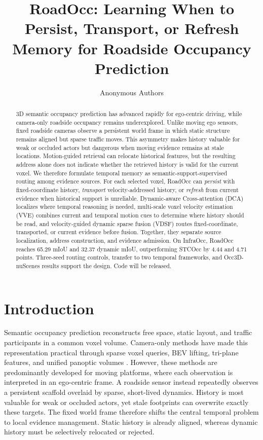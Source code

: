 \documentclass{article}
\title{RoadOcc: Learning When to Persist, Transport, or Refresh Memory for Roadside Occupancy Prediction}
\author{Anonymous Authors}
\newcommand{\method}{RoadOcc}
\begin{document}
\maketitle

\begin{abstract}
3D semantic occupancy prediction has advanced rapidly for ego-centric driving,
while camera-only roadside occupancy remains underexplored. Unlike moving ego
sensors, fixed roadside cameras observe a persistent world frame in which static
structure remains aligned but sparse traffic moves. This asymmetry makes history
valuable for weak or occluded actors but dangerous when moving evidence remains
at stale locations. Motion-guided retrieval can relocate historical features,
but the resulting address alone does not indicate whether the retrieved history
is valid for the current voxel. We therefore formulate temporal memory
as semantic-support-supervised routing among evidence sources. For each selected voxel,
\method{} can \emph{persist} with fixed-coordinate history, \emph{transport}
velocity-addressed history, or \emph{refresh} from current evidence when
historical support is unreliable. Dynamic-aware Cross-attention (DCA) localizes
where temporal reasoning is needed, multi-scale voxel velocity estimation (VVE)
combines current and temporal motion cues to determine where history should be
read, and velocity-guided dynamic sparse fusion (VDSF) routes fixed-coordinate,
transported, or current evidence before fusion. Together, they separate source
localization, address construction, and evidence admission. On InfraOcc,
RoadOcc reaches 65.29 mIoU and 32.37 dynamic mIoU, outperforming STCOcc by
4.44 and 4.71 points. Three-seed routing controls, transfer to two temporal
frameworks, and Occ3D-nuScenes results support the design. Code will be released.
\end{abstract}

\section{Introduction}
\label{sec:introduction}

Semantic occupancy prediction reconstructs free space, static layout, and
traffic participants in a common voxel volume. Camera-only methods have made
this representation practical through sparse voxel queries, BEV lifting,
tri-plane features, and unified panoptic volumes
\citep{MonoScene,VoxFormer,OpenOccupancy,Occ3D2023,BEVFormer,TPVFormer,
SurroundOcc,SparseOcc,GaussianFormer}. However, these methods
are predominantly developed for moving platforms, where each observation is
interpreted in an ego-centric frame. A roadside sensor instead repeatedly
observes a persistent scaffold overlaid by sparse, short-lived dynamics. History
is most valuable for weak or occluded actors, yet stale footprints can overwrite
exactly these targets. The fixed world frame therefore shifts the central
temporal problem to local evidence management.
Static history is already aligned, whereas dynamic history must be selectively
relocated or rejected.
\end{document}
